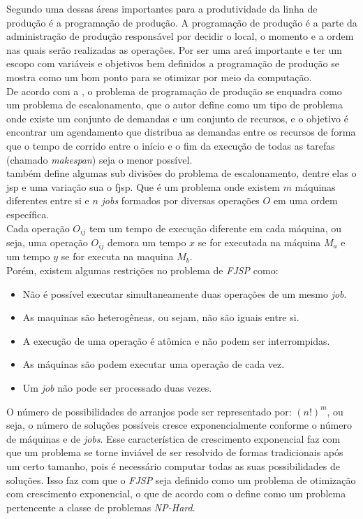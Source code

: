 \indent Segundo  uma dessas áreas importantes para a produtividade da linha de produção é a programação de produção. 
A programação de produção é a parte da administração de produção responsável por decidir o local, o momento e a ordem nas quais serão realizadas as operações. 
Por ser uma areá importante e ter um escopo com variáveis e objetivos bem definidos a programação de produção se mostra como um bom ponto para se otimizar por meio da computação.\\
\indent De acordo com a \citeauthor{Bagchi1999}, o problema de programação de produção se enquadra como um problema de escalonamento, que o autor define como um tipo de problema onde existe um conjunto de demandas e um conjunto de recursos, e o objetivo é encontrar um agendamento que distribua as demandas entre os recursos de forma que o tempo de corrido entre o início e o fim da execução de todas as tarefas (chamado \textit{makespan}) seja o menor possível.\\
\indent \citeauthor{Bagchi1999} também define algumas sub divisões do problema de escalonamento, dentre elas o \gls{jsp} e uma variação sua o \gls{fjsp}. 
Que é um problema onde existem $m$ máquinas diferentes entre si e $n$ \textit{jobs} formados por diversas operações $O$ em uma ordem específica.\\
Cada operação $O_{ij}$ tem um tempo de execução diferente em cada máquina, ou seja, uma operação 
$O_{ij}$ demora um tempo $x$ se for executada na máquina $M_a$ e um tempo $y$ se for executa na maquina $M_b$.\\
Porém, existem algumas restrições no problema de \textit{FJSP} como:
\begin{itemize}
    \item Não é possível executar simultaneamente duas operações de um mesmo \textit{job}.
    \item As maquinas são heterogêneas, ou sejam, não são iguais entre si.
    \item A execução de uma operação é atômica e não podem ser interrompidas.
    \item As máquinas são podem executar uma operação de cada vez.
    \item Um \textit{job} não pode ser processado duas vezes.
\end{itemize}

O número de possibilidades de arranjos pode ser representado por: $(n!)^m$, ou seja, o número de soluções possíveis cresce exponencialmente conforme o número de máquinas e de \textit{jobs}.
Esse característica de crescimento exponencial faz com que um problema se torne inviável de ser resolvido de formas tradicionais após um certo tamanho, pois é necessário computar todas as suas possibilidades de soluções.
Isso faz com que o \textit{FJSP} seja definido como um problema de otimização com crescimento exponencial, o que de acordo com \citeauthor{Eswaramurthy2008} o define como um problema pertencente a classe de problemas \textit{NP-Hard}.\hfill

